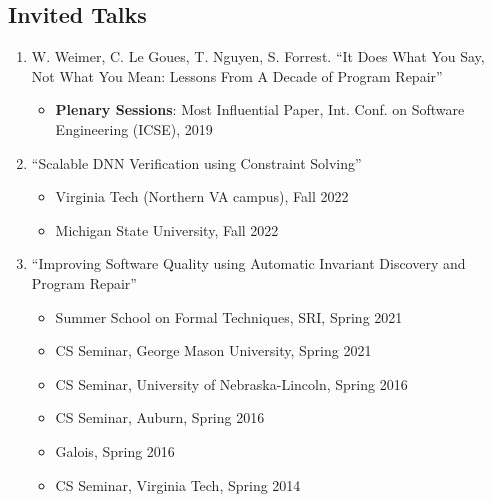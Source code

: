 \documentclass[11pt]{article}
\begin{document}

\subsection{Invited Talks}
\begin{enumerate}[label=T\arabic*]
\item W. Weimer, C. Le Goues, T. Nguyen, S. Forrest. ``It Does What You Say, Not What You Mean: Lessons From A Decade of Program Repair''
  \begin{itemize}[label={},before=\small]
  \item \textbf{Plenary Sessions}:  Most Influential Paper, Int. Conf. on Software Engineering (ICSE), 2019
\end{itemize}
  
\item ``Scalable DNN Verification using Constraint Solving''
  \begin{itemize}[label={},before=\small]
  \item Virginia Tech (Northern VA campus), Fall 2022
  \item Michigan State University, Fall 2022
  \end{itemize}
  
\item ``Improving Software Quality using Automatic Invariant Discovery and Program Repair''
  \begin{itemize}[label={},before=\small]
    \item Summer School on Formal Techniques, SRI, Spring 2021
    \item CS Seminar, George Mason University, Spring 2021
    \item CS Seminar, University of Nebraska-Lincoln, Spring 2016
    \item CS Seminar, Auburn, Spring 2016
    \item Galois, Spring 2016
    \item CS Seminar, Virginia Tech, Spring 2014
  \end{itemize}
\end{enumerate}
\end{document}

